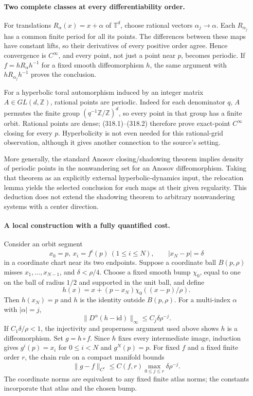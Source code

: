 \documentclass[11pt]{article}
\begin{document}
\paragraph{Two complete classes at every differentiability order.}
For translations $R_\alpha(x)=x+\alpha$ of $\mathbb T^d$, choose
rational vectors $\alpha_j\to\alpha$. Each $R_{\alpha_j}$ has
a common finite period for all its points. The differences between
these maps have constant lifts, so their derivatives of every
positive order agree. Hence convergence is $C^\infty$, and every
point, not just a point near $p$, becomes periodic. If
$f=hR_\alpha h^{-1}$ for a fixed smooth diffeomorphism $h$, the
same argument with $hR_{\alpha_j}h^{-1}$ proves the conclusion.

For a hyperbolic toral automorphism induced by an integer matrix
$A\in GL(d,\mathbb Z)$, rational points are periodic. Indeed for
each denominator $q$, $A$ permutes the finite group
$(q^{-1}\mathbb Z/\mathbb Z)^d$, so every point in that group
has a finite orbit. Rational points are dense; (318.1)--(318.2)
therefore prove exact-point $C^\infty$ closing for every $p$.
Hyperbolicity is not even needed for this rational-grid observation,
although it gives another connection to the source's setting.

More generally, the standard Anosov closing/shadowing theorem
implies density of periodic points in the nonwandering set for an
Anosov diffeomorphism. Taking that theorem as an explicitly external
hyperbolic-dynamics input, the relocation lemma yields the selected
conclusion for such maps at their given regularity. This deduction
does not extend the shadowing theorem to arbitrary nonwandering
systems with a center direction.

\paragraph{A local construction with a fully quantified cost.}
Consider an orbit segment
\[
 x_0=p,\ x_i=f^i(p)\ (1\leq i\leq N),
 \qquad |x_N-p|=\delta
\]
in a coordinate chart near its two endpoints. Suppose a coordinate
ball $B(p,\rho)$ misses $x_1,\ldots,x_{N-1}$, and
$\delta<\rho/4$. Choose a fixed smooth bump $\chi_0$, equal to
one on the ball of radius $1/2$ and supported in the unit ball,
and define
\[
 h(x)=x+(p-x_N)\chi_0((x-p)/\rho).
 \tag{318.3}
\]
Then $h(x_N)=p$ and $h$ is the identity outside $B(p,\rho)$.
For a multi-index $\alpha$ with $|\alpha|=j$,
\[
 \|D^\alpha(h-\mathrm{id})\|_\infty
      \leq C_j\delta\rho^{-j}.
 \tag{318.4}
\]
If $C_1\delta/\rho<1$, the injectivity and properness argument
used above shows $h$ is a diffeomorphism. Set $g=h\circ f$.
Since $h$ fixes every intermediate image, induction gives
$g^i(p)=x_i$ for $0\leq i<N$ and $g^N(p)=p$.
For fixed $f$ and a fixed finite order $r$, the chain rule on a
compact manifold bounds
\[
 \|g-f\|_{C^r}\leq C(f,r)\max_{0\leq j\leq r}
                                      \delta\rho^{-j}.
 \tag{318.5}
\]
The coordinate norms are equivalent to any fixed finite atlas norms;
the constants incorporate that atlas and the chosen bump.
\end{document}
